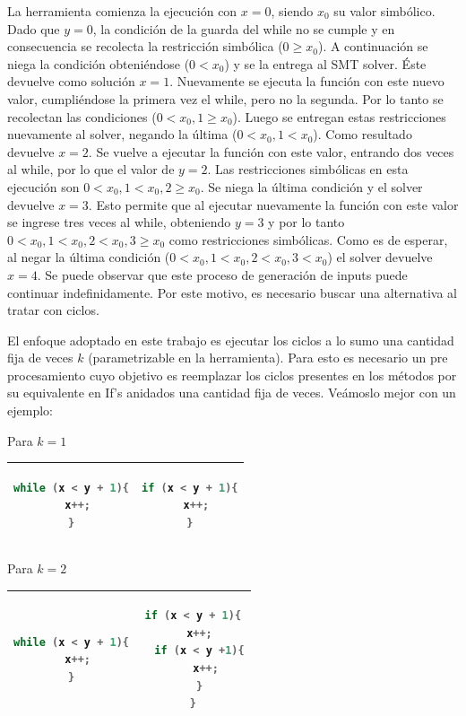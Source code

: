 \documentclass{llncs}
\begin{document}
La herramienta comienza la ejecución con $x=0$, siendo $x_0$ su valor simbólico. Dado que $y=0$, la condición de la guarda del while no se cumple y en consecuencia se recolecta la restricción simbólica ($0 \geq x_0$). A continuación se niega la condición obteniéndose ($0<x_0$) y se la entrega al SMT solver. Éste devuelve como solución $x=1$. Nuevamente se ejecuta la función con este nuevo valor, cumpliéndose la primera vez el while, pero no la segunda. Por lo tanto se recolectan las condiciones ($0 < x_0, 1 \geq x_0$). Luego se entregan estas restricciones nuevamente al solver, negando la última ($0<x_0, 1<x_0$). Como resultado devuelve $x=2$. Se vuelve a ejecutar la función con este valor, entrando dos veces al while, por lo que el valor de $y=2$. Las restricciones simbólicas en esta ejecución son $0<x_0, 1<x_0, 2 \geq x_0$. Se niega la última condición y el solver devuelve $x=3$. Esto permite que al ejecutar nuevamente la función con este valor se ingrese
tres veces al while, obteniendo $y=3$ y por lo tanto $0<x_0, 1<x_0, 2<x_0, 3 \geq x_0$ como restricciones simbólicas. Como es de esperar, al negar la última condición ($0<x_0, 1<x_0, 2<x_0, 3<x_0$) el solver devuelve $x=4$. Se puede observar que este proceso de generación de inputs puede continuar indefinidamente. Por este motivo, es necesario buscar una alternativa al tratar con ciclos.

El enfoque adoptado en este trabajo es ejecutar los ciclos a lo sumo una cantidad fija de veces $k$ (parametrizable en la herramienta). Para esto es necesario un pre procesamiento
cuyo objetivo es reemplazar los ciclos presentes en los métodos por su equivalente en If’s anidados una cantidad fija de veces. Veámoslo mejor con un ejemplo:\\
\newline

Para \(k = 1\)
\begin{table}
\centering
\begin{tabular}{|c | c|}
\hline
\begin{lstlisting}[language=Java]
while (x < y + 1){
  x++;
}
\end{lstlisting} & 
\begin{lstlisting}[language=Java]
if (x < y + 1){
  x++;
}
\end{lstlisting}\\
\hline
\end{tabular}
\end{table}

Para \(k = 2\)
\begin{table}
\centering
\begin{tabular}{|c | c|}
\hline
\begin{lstlisting}[language=Java]
while (x < y + 1){
  x++;
}
\end{lstlisting} & 
\begin{lstlisting}[language=Java]
if (x < y + 1){
  x++;
  if (x < y +1){
    x++;
  }
}
\end{lstlisting}\\
\hline
\end{tabular}
\end{table}
\end{document}
